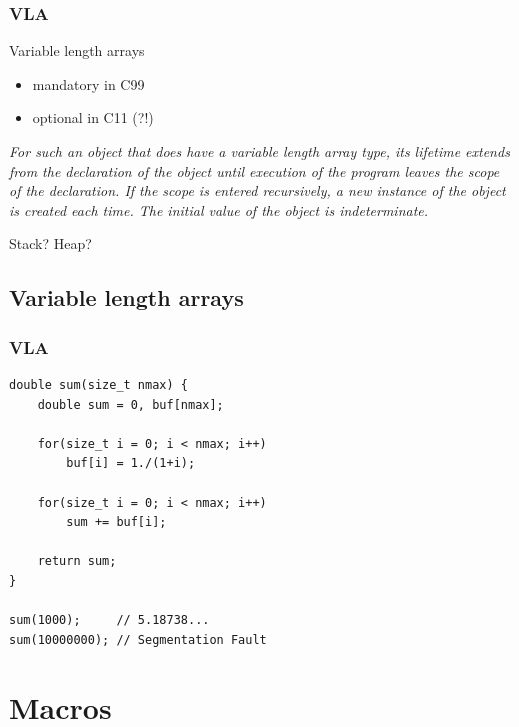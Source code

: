 \documentclass[12pt,compress]{beamer}
\begin{document}
\begin{frame}
    \frametitle{VLA}

    Variable length arrays
    \begin{itemize}
    \item mandatory in C99
    \item optional in C11 (?!)
    \end{itemize}

    \vfill

    {{\it For such an object that does have a variable length array type, its
    lifetime extends from the declaration of the object until execution of the
    program leaves the scope of the declaration. If the scope is entered
    recursively, a new instance of the object is created each time. The initial
    value of the object is indeterminate.}} 

    \vfill

    {
        \begin{center}
    {\Large    Stack? \quad Heap?    }
        \end{center}
    }

\end{frame}

\subsection{Variable length arrays}
\begin{frame}[fragile]
    \frametitle{VLA}

\begin{lstlisting}
double sum(size_t nmax) {
    double sum = 0, buf[nmax];

    for(size_t i = 0; i < nmax; i++)
        buf[i] = 1./(1+i);

    for(size_t i = 0; i < nmax; i++)
        sum += buf[i];

    return sum;
}

sum(1000);     // 5.18738...
sum(10000000); // Segmentation Fault
\end{lstlisting}
\end{frame}


\section{Macros}

\end{document}
